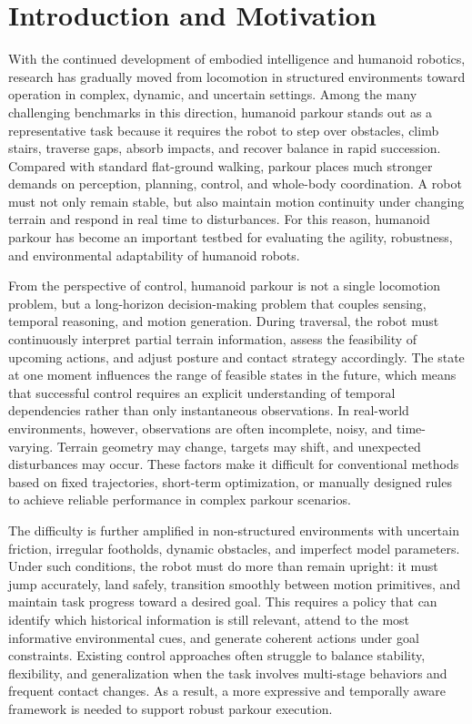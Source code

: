 \chapter{Introduction and Motivation}

With the continued development of embodied intelligence and humanoid robotics, research has gradually moved from locomotion in structured environments toward operation in complex, dynamic, and uncertain settings. Among the many challenging benchmarks in this direction, humanoid parkour stands out as a representative task because it requires the robot to step over obstacles, climb stairs, traverse gaps, absorb impacts, and recover balance in rapid succession. Compared with standard flat-ground walking, parkour places much stronger demands on perception, planning, control, and whole-body coordination. A robot must not only remain stable, but also maintain motion continuity under changing terrain and respond in real time to disturbances. For this reason, humanoid parkour has become an important testbed for evaluating the agility, robustness, and environmental adaptability of humanoid robots.

From the perspective of control, humanoid parkour is not a single locomotion problem, but a long-horizon decision-making problem that couples sensing, temporal reasoning, and motion generation. During traversal, the robot must continuously interpret partial terrain information, assess the feasibility of upcoming actions, and adjust posture and contact strategy accordingly. The state at one moment influences the range of feasible states in the future, which means that successful control requires an explicit understanding of temporal dependencies rather than only instantaneous observations. In real-world environments, however, observations are often incomplete, noisy, and time-varying. Terrain geometry may change, targets may shift, and unexpected disturbances may occur. These factors make it difficult for conventional methods based on fixed trajectories, short-term optimization, or manually designed rules to achieve reliable performance in complex parkour scenarios.

The difficulty is further amplified in non-structured environments with uncertain friction, irregular footholds, dynamic obstacles, and imperfect model parameters. Under such conditions, the robot must do more than remain upright: it must jump accurately, land safely, transition smoothly between motion primitives, and maintain task progress toward a desired goal. This requires a policy that can identify which historical information is still relevant, attend to the most informative environmental cues, and generate coherent actions under goal constraints. Existing control approaches often struggle to balance stability, flexibility, and generalization when the task involves multi-stage behaviors and frequent contact changes. As a result, a more expressive and temporally aware framework is needed to support robust parkour execution.


